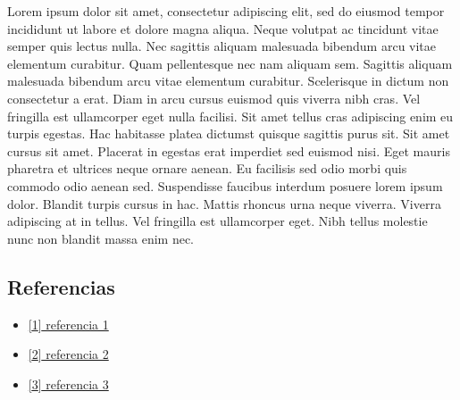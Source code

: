 \documentclass[11pt]{article}
\makeatletter
\providecommand{\tightlist}{%
      \setlength{\itemsep}{0pt}\setlength{\parskip}{0pt}}
\newcommand{\boxspacing}{\kern\kvtcb@left@rule\kern\kvtcb@boxsep}
\newcommand{\prompt}[4]{
        {\ttfamily\llap{{\color{#2}[#3]:\hspace{3pt}#4}}\vspace{-\baselineskip}}
    }
\makeatother
\begin{document}
Lorem ipsum dolor sit amet, consectetur adipiscing elit, sed do eiusmod
tempor incididunt ut labore et dolore magna aliqua. Neque volutpat ac
tincidunt vitae semper quis lectus nulla. Nec sagittis aliquam malesuada
bibendum arcu vitae elementum curabitur. Quam pellentesque nec nam
aliquam sem. Sagittis aliquam malesuada bibendum arcu vitae elementum
curabitur. Scelerisque in dictum non consectetur a erat. Diam in arcu
cursus euismod quis viverra nibh cras. Vel fringilla est ullamcorper
eget nulla facilisi. Sit amet tellus cras adipiscing enim eu turpis
egestas. Hac habitasse platea dictumst quisque sagittis purus sit. Sit
amet cursus sit amet. Placerat in egestas erat imperdiet sed euismod
nisi. Eget mauris pharetra et ultrices neque ornare aenean. Eu facilisis
sed odio morbi quis commodo odio aenean sed. Suspendisse faucibus
interdum posuere lorem ipsum dolor. Blandit turpis cursus in hac. Mattis
rhoncus urna neque viverra. Viverra adipiscing at in tellus. Vel
fringilla est ullamcorper eget. Nibh tellus molestie nunc non blandit
massa enim nec.

\subsection{Referencias}\label{referencias}

\begin{itemize}
\tightlist
\item
  \href{'https://www.youtube.com/watch?v=dQw4w9WgXcQ'}{{[}1{]}
  referencia 1}
\item
  \href{'https://www.youtube.com/watch?v=dQw4w9WgXcQ'}{{[}2{]}
  referencia 2}
\item
  \href{'https://www.youtube.com/watch?v=dQw4w9WgXcQ'}{{[}3{]}
  referencia 3}
\end{itemize}

    \begin{tcolorbox}[breakable, size=fbox, boxrule=1pt, pad at break*=1mm,colback=cellbackground, colframe=cellborder]
\prompt{In}{incolor}{ }{\boxspacing}
\begin{Verbatim}[commandchars=\\\{\}]

\end{Verbatim}
\end{tcolorbox}

    \begin{tcolorbox}[breakable, size=fbox, boxrule=1pt, pad at break*=1mm,colback=cellbackground, colframe=cellborder]
\prompt{In}{incolor}{ }{\boxspacing}
\begin{Verbatim}[commandchars=\\\{\}]

\end{Verbatim}
\end{tcolorbox}

    \begin{tcolorbox}[breakable, size=fbox, boxrule=1pt, pad at break*=1mm,colback=cellbackground, colframe=cellborder]
\prompt{In}{incolor}{ }{\boxspacing}
\begin{Verbatim}[commandchars=\\\{\}]

\end{Verbatim}
\end{tcolorbox}


    
    
    
\end{document}
